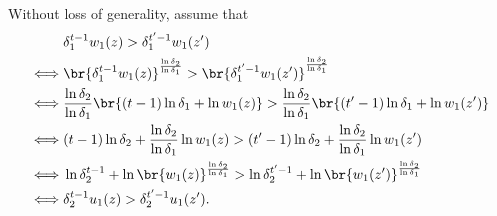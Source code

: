 Without loss of generality, assume that
\[
\begin{aligned}
  & \delta_1^{t-1}w_1(z)>\delta_1^{t'-1}w_1(z')\\
  \iff & \br{\delta_1^{t-1}w_1(z)}^{\frac{\ln \delta_2}{\ln \delta_1}}>\br{\delta_1^{t'-1}w_1(z')}^{\frac{\ln \delta_2}{\ln \delta_1}}\\
  \iff & \frac{\ln \delta_2}{\ln \delta_1}\br{(t-1)\ln \delta_1+ \ln w_1(z)} > \frac{\ln \delta_2}{\ln \delta_1} \br{(t'-1)\ln \delta_1+ \ln w_1(z')}\\
  \iff & (t-1)\ln \delta_2 + \frac{\ln \delta_2}{\ln \delta_1}\ln w_1(z) > (t'-1)\ln \delta_2 + \frac{\ln \delta_2}{\ln \delta_1}\ln w_1(z')\\
  \iff & \ln \delta_2^{t-1} + \ln \br{w_1(z)}^{\frac{\ln \delta_2}{\ln \delta_1}} > \ln \delta_2^{t'-1} + \ln \br{w_1(z')}^{\frac{\ln \delta_2}{\ln \delta_1}}\\
  \iff & \delta_2^{t-1}u_1(z) > \delta_2^{t'-1}u_1(z').
\end{aligned}
\]

